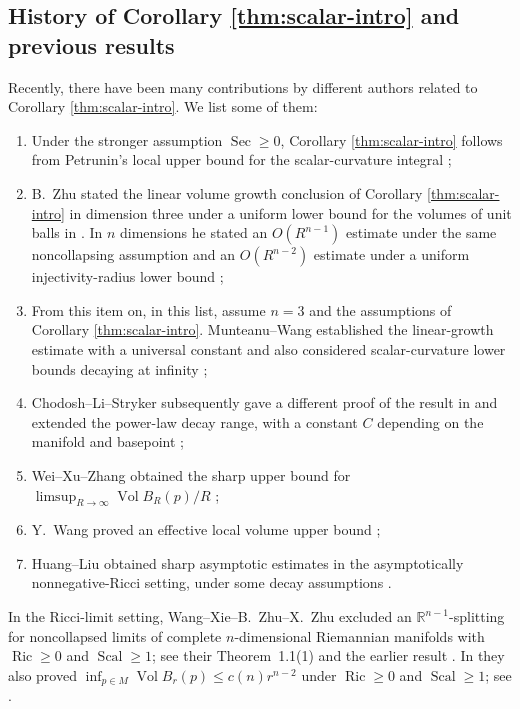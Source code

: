 \documentclass[11pt]{amsart}
\theoremstyle{definition}
\theoremstyle{remark}
\DeclareMathOperator{\Ric}{Ric}
\DeclareMathOperator{\Scal}{Scal}
\DeclareMathOperator{\Vol}{Vol}
\newcommand{\R}{\mathbb R}
\begin{document}
\subsection*{History of Corollary \ref{thm:scalar-intro} and previous results}

Recently, there have been many contributions by different authors related to Corollary \ref{thm:scalar-intro}. We list some of them:
\begin{enumerate}[label=\textup{(\arabic*)},leftmargin=2.2em]
\item Under the stronger assumption $\operatorname{Sec}\geq0$, Corollary \ref{thm:scalar-intro} follows from Petrunin's local upper bound for the
scalar-curvature integral \cite{Petrunin};
\item B.~Zhu stated the linear volume growth conclusion of Corollary \ref{thm:scalar-intro} in dimension three under a uniform lower bound for the volumes of unit balls in \cite[Theorem~1.8]{BZhu}.  In $n$ dimensions he stated an $O(R^{n-1})$ estimate under the same noncollapsing assumption and an $O(R^{n-2})$ estimate under a uniform injectivity-radius lower bound \cite[Corollary~1.9]{BZhu};
\item From this item on, in this list, assume $n=3$ and the assumptions of Corollary \ref{thm:scalar-intro}. Munteanu--Wang established the linear-growth estimate with a
      universal constant and also considered scalar-curvature lower
      bounds decaying at infinity \cite{MunteanuWang};
\item Chodosh--Li--Stryker subsequently gave a different proof of the result in \cite{MunteanuWang} and
      extended the power-law decay range, with a constant $C$ depending on
      the manifold and basepoint \cite{ChodoshLiStryker};
\item Wei--Xu--Zhang obtained the sharp upper bound for
      $\limsup_{R\to\infty}\Vol B_R(p)/R$ \cite{WeiXuZhang};
\item Y.~Wang proved an effective local volume upper bound
      \cite{YWang};
\item Huang--Liu obtained sharp asymptotic estimates in the
      asymptotically nonnegative-Ricci setting, under some decay assumptions \cite{HuangLiu}.
\end{enumerate}

In the Ricci-limit setting, Wang--Xie--B.~Zhu--X.~Zhu
\cite{WangXieZhuZhu} excluded an $\R^{n-1}$-splitting for noncollapsed
limits of complete $n$-dimensional Riemannian manifolds with $\Ric\geq0$ and
$\Scal\geq1$; see their Theorem~1.1(1) and the earlier result
\cite{BZhuXZhu}.  In \cite{WangXieZhuZhu} they
also proved
$
       \inf_{p\in M}\Vol B_r(p)\leq c(n)r^{n-2}$ 
under $\Ric\geq0$ and $\Scal\geq1$; see
\cite[Theorem~1.9]{WangXieZhuZhu}.
\end{document}
